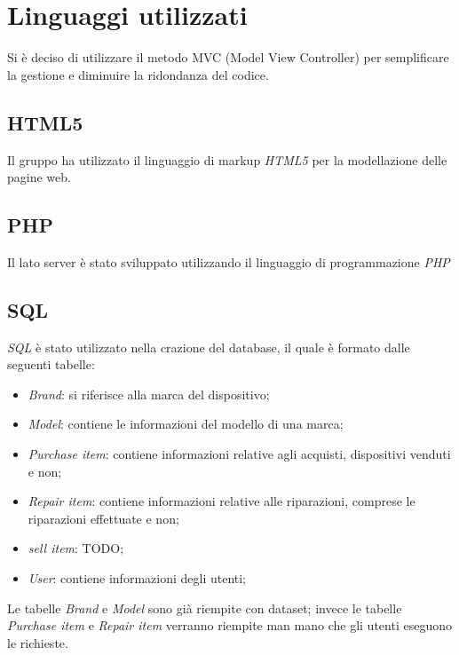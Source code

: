 \section{Linguaggi utilizzati}

Si è deciso di utilizzare il metodo MVC (Model View Controller) per semplificare la gestione
e diminuire la ridondanza del codice.

\subsection{HTML5}
Il gruppo ha utilizzato il linguaggio di markup \textit{HTML5} per la
modellazione delle pagine web.

\subsection{PHP}
Il lato server è stato sviluppato utilizzando il linguaggio di programmazione \textit{PHP}

\subsection{SQL}
\textit{SQL} è stato utilizzato nella crazione del database, il quale è formato dalle seguenti tabelle:

\begin{itemize}
	\item \textit{Brand}: si riferisce alla marca del dispositivo;
	\item \textit{Model}: contiene le informazioni del modello di una marca;
	\item \textit{Purchase item}: contiene informazioni relative agli acquisti, dispositivi venduti e non;
	\item \textit{Repair item}: contiene informazioni relative alle riparazioni, comprese le riparazioni effettuate e non;
	\item \textit{sell item}: TODO;
	\item \textit{User}: contiene informazioni degli utenti;
\end{itemize}

Le tabelle \textit{Brand} e \textit{Model} sono già riempite con dataset; invece le tabelle \textit{Purchase item} e \textit{Repair item}
verranno riempite man mano che gli utenti eseguono le richieste.

